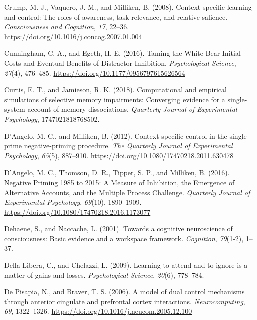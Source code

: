 \documentclass[]{DissertateCUNY}
\begin{document}
\leavevmode\hypertarget{ref-crump_context-specific_2008}{}%
Crump, M. J., Vaquero, J. M., and Milliken, B. (2008). Context-specific
learning and control: The roles of awareness, task relevance, and
relative salience. \emph{Consciousness and Cognition}, \emph{17},
22--36. \url{https://doi.org/10.1016/j.concog.2007.01.004}

\leavevmode\hypertarget{ref-cunningham_taming_2016}{}%
Cunningham, C. A., and Egeth, H. E. (2016). Taming the White Bear
Initial Costs and Eventual Benefits of Distractor Inhibition.
\emph{Psychological Science}, \emph{27}(4), 476--485.
\url{https://doi.org/10.1177/0956797615626564}

\leavevmode\hypertarget{ref-curtis_computational_2018}{}%
Curtis, E. T., and Jamieson, R. K. (2018). Computational and empirical
simulations of selective memory impairments: Converging evidence for a
single-system account of memory dissociations. \emph{Quarterly Journal
of Experimental Psychology}, 1747021818768502.

\leavevmode\hypertarget{ref-dangelo_context-specific_2012}{}%
D'Angelo, M. C., and Milliken, B. (2012). Context-specific control in
the single-prime negative-priming procedure. \emph{The Quarterly Journal
of Experimental Psychology}, \emph{65}(5), 887--910.
\url{https://doi.org/10.1080/17470218.2011.630478}

\leavevmode\hypertarget{ref-dangelo_negative_2016}{}%
D'Angelo, M. C., Thomson, D. R., Tipper, S. P., and Milliken, B. (2016).
Negative Priming 1985 to 2015: A Measure of Inhibition, the Emergence of
Alternative Accounts, and the Multiple Process Challenge.
\emph{Quarterly Journal of Experimental Psychology}, \emph{69}(10),
1890--1909. \url{https://doi.org/10.1080/17470218.2016.1173077}

\leavevmode\hypertarget{ref-dehaene_towards_2001}{}%
Dehaene, S., and Naccache, L. (2001). Towards a cognitive neuroscience
of consciousness: Basic evidence and a workspace framework.
\emph{Cognition}, \emph{79}(1-2), 1--37.

\leavevmode\hypertarget{ref-della_libera_learning_2009}{}%
Della Libera, C., and Chelazzi, L. (2009). Learning to attend and to
ignore is a matter of gains and losses. \emph{Psychological Science},
\emph{20}(6), 778--784.

\leavevmode\hypertarget{ref-de_pisapia_model_2006}{}%
De Pisapia, N., and Braver, T. S. (2006). A model of dual control
mechanisms through anterior cingulate and prefrontal cortex
interactions. \emph{Neurocomputing}, \emph{69}, 1322--1326.
\url{https://doi.org/10.1016/j.neucom.2005.12.100}
\end{document}
